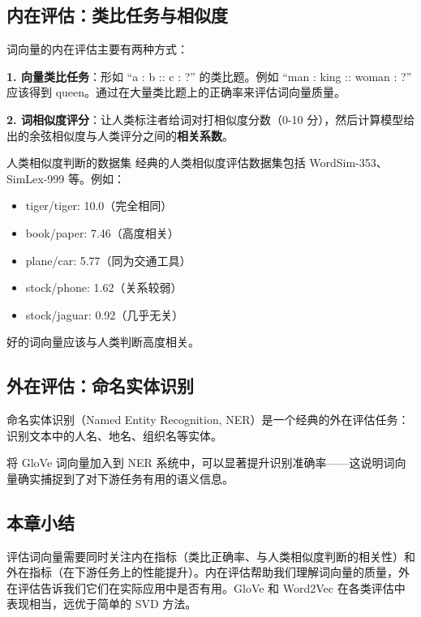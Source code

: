 \documentclass[a4paper]{article}
\begin{document}
\subsection{内在评估：类比任务与相似度}

词向量的内在评估主要有两种方式：

\textbf{1. 向量类比任务}：形如 ``a : b :: c : ?'' 的类比题。例如 ``man : king :: woman : ?'' 应该得到 queen。通过在大量类比题上的正确率来评估词向量质量。





\textbf{2. 词相似度评分}：让人类标注者给词对打相似度分数（0-10 分），然后计算模型给出的余弦相似度与人类评分之间的\textbf{相关系数}。

\begin{knowledgebox}{人类相似度判断的数据集}
经典的人类相似度评估数据集包括 WordSim-353、SimLex-999 等。例如：
\begin{itemize}
    \item tiger/tiger: 10.0（完全相同）
    \item book/paper: 7.46（高度相关）
    \item plane/car: 5.77（同为交通工具）
    \item stock/phone: 1.62（关系较弱）
    \item stock/jaguar: 0.92（几乎无关）
\end{itemize}
好的词向量应该与人类判断高度相关。
\end{knowledgebox}

\subsection{外在评估：命名实体识别}

命名实体识别（Named Entity Recognition, NER）是一个经典的外在评估任务：识别文本中的人名、地名、组织名等实体。

将 GloVe 词向量加入到 NER 系统中，可以显著提升识别准确率——这说明词向量确实捕捉到了对下游任务有用的语义信息。

\subsection{本章小结}

评估词向量需要同时关注内在指标（类比正确率、与人类相似度判断的相关性）和外在指标（在下游任务上的性能提升）。内在评估帮助我们理解词向量的质量，外在评估告诉我们它们在实际应用中是否有用。GloVe 和 Word2Vec 在各类评估中表现相当，远优于简单的 SVD 方法。
\end{document}
